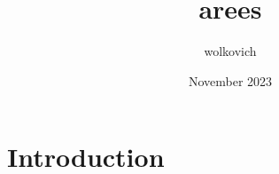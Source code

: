 \documentclass{article}
\title{arees}
\author{wolkovich }
\date{November 2023}
\begin{document}
\maketitle

\section{Introduction}
\end{document}
